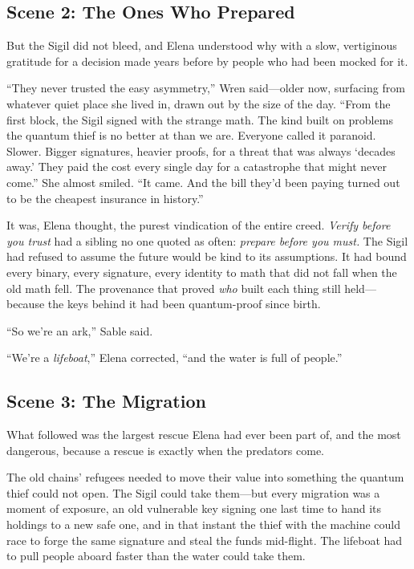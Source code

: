 \hypertarget{scene-2-the-ones-who-prepared}{%
\subsection{Scene 2: The Ones Who
Prepared}\label{scene-2-the-ones-who-prepared}}

But the Sigil did not bleed, and Elena understood why with a slow, vertiginous
gratitude for a decision made years before by people who had been mocked for it.

``They never trusted the easy asymmetry,'' Wren said---older now, surfacing from
whatever quiet place she lived in, drawn out by the size of the day. ``From the
first block, the Sigil signed with the strange math. The kind built on problems the
quantum thief is no better at than we are. Everyone called it paranoid. Slower.
Bigger signatures, heavier proofs, for a threat that was always `decades away.'
They paid the cost every single day for a catastrophe that might never come.'' She
almost smiled. ``It came. And the bill they'd been paying turned out to be the
cheapest insurance in history.''

It was, Elena thought, the purest vindication of the entire creed. \emph{Verify
before you trust} had a sibling no one quoted as often: \emph{prepare before you
must.} The Sigil had refused to assume the future would be kind to its
assumptions. It had bound every binary, every signature, every identity to math
that did not fall when the old math fell. The provenance that proved \emph{who}
built each thing still held---because the keys behind it had been quantum-proof
since birth.

``So we're an ark,'' Sable said.

``We're a \emph{lifeboat},'' Elena corrected, ``and the water is full of people.''

\hypertarget{scene-3-the-migration}{%
\subsection{Scene 3: The
Migration}\label{scene-3-the-migration}}

What followed was the largest rescue Elena had ever been part of, and the most
dangerous, because a rescue is exactly when the predators come.

The old chains' refugees needed to move their value into something the quantum
thief could not open. The Sigil could take them---but every migration was a moment
of exposure, an old vulnerable key signing one last time to hand its holdings to a
new safe one, and in that instant the thief with the machine could race to forge
the same signature and steal the funds mid-flight. The lifeboat had to pull people
aboard faster than the water could take them.

